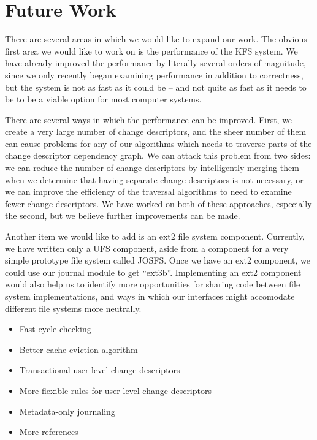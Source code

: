 \section {Future Work}
\label{sec:future}

There are several areas in which we would like to expand our work. The obvious
first area we would like to work on is the performance of the KFS system. We
have already improved the performance by literally several orders of magnitude,
since we only recently began examining performance in addition to correctness,
but the system is not as fast as it could be -- and not quite as fast as it
needs to be to be a viable option for most computer systems.

There are several ways in which the performance can be improved. First, we
create a very large number of change descriptors, and the sheer number of them
can cause problems for any of our algorithms which needs to traverse parts of
the change descriptor dependency graph. We can attack this problem from two
sides: we can reduce the number of change descriptors by intelligently merging
them when we determine that having separate change descriptors is not necessary,
or we can improve the efficiency of the traversal algorithms to need to examine
fewer change descriptors. We have worked on both of these approaches, especially
the second, but we believe further improvements can be made.

Another item we would like to add is an ext2 file system component. Currently,
we have written only a UFS component, aside from a component for a very simple
prototype file system called JOSFS. Once we have an ext2 component, we could use
our journal module to get ``ext3b''. Implementing an ext2 component would also
help us to identify more opportunities for sharing code between file system
implementations, and ways in which our interfaces might accomodate different
file systems more neutrally.

\begin{itemize}
\item Fast cycle checking
\item Better cache eviction algorithm
\item Transactional user-level change descriptors
\item More flexible rules for user-level change descriptors
\item Metadata-only journaling
\item More references
\end{itemize}
